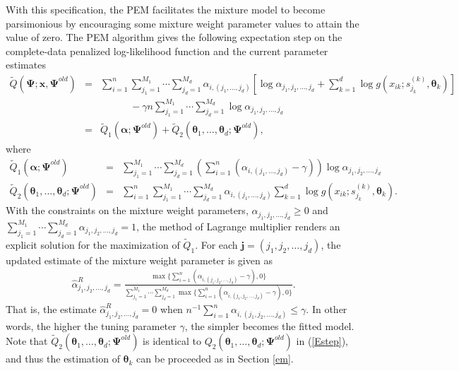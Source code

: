 \documentclass[11pt]{article}
\def\a{\alpha} \def\b{\beta}
\def\bea{\begin{eqnarray*}} \def\eea{\end{eqnarray*}}
\def\beq{\begin{eqnarray}} \def\eeq{\end{eqnarray}}
\begin{document}
With this specification, the PEM facilitates the mixture model to become parsimonious by encouraging some mixture weight parameter values to attain the value of zero. The PEM algorithm gives the following expectation step on the complete-data penalized log-likelihood function and the current parameter estimates 
\beq\label{rEstep}\nonumber
\tilde{Q}(\bm{\Psi};\bm{x}, \bm{\Psi}^{old}) &=& \sum_{i=1}^n \sum_{j_1 = 1}^{M_1} \cdots\sum_{j_d = 1}^{M_d} \a_{i,(j_1,\ldots,j_d)}\left[\log \a_{j_1,j_2,\ldots,j_d} + \sum_{k=1}^d \log g(x_{ik};s^{(k)}_{j_k}, \bm{\theta}_k)\right]\\\nonumber
&&\quad\quad\quad - \gamma n \sum_{j_1 = 1}^{M_1} \cdots\sum_{j_d = 1}^{M_d}\log \a_{j_1,j_2,\ldots,j_d}\\\nonumber
&=& \tilde{Q}_1(\bm{\a};\bm{\Psi}^{old}) + \tilde{Q}_2(\bm{\theta}_1,\ldots, \bm{\theta}_d;\bm{\Psi}^{old}), 
\eeq
where
\bea
\tilde{Q}_1(\bm{\a};\bm{\Psi}^{old})  &=& \sum_{j_1 = 1}^{M_1} \cdots\sum_{j_d = 1}^{M_d} \left(\sum_{i=1}^n (\a_{i,(j_1,\ldots,j_d)}-\gamma)\right) \log \a_{j_1,j_2,\ldots,j_d}\\
\tilde{Q}_2(\bm{\theta}_1,\ldots, \bm{\theta}_d;\bm{\Psi}^{old}) &=& \sum_{i=1}^n \sum_{j_1 = 1}^{M_1} \cdots\sum_{j_d = 1}^{M_d} \a_{i,(j_1,\ldots,j_d)}\sum_{k=1}^d \log g(x_{ik};s^{(k)}_{j_k}, \bm{\theta}_k).
\eea
With the constraints on the mixture weight parameters, $\a_{j_1,j_2,\ldots,j_d} \ge 0$ and $\sum_{j_1 = 1}^{M_1} \cdots\sum_{j_d = 1}^{M_d} \a_{j_1,j_2,\ldots,j_d} = 1$, the method of Lagrange multiplier  renders an explicit solution for the maximization of $\tilde{Q}_1$. For each $\bm{j} = (j_1,j_2,\ldots,j_d)$, the updated estimate of the mixture weight parameter is given as
\bea
\hat{\a}^{R}_{j_1,j_2,\ldots,j_d}  = \frac{\max\{\sum_{i=1}^n \left(\a_{i,(j_1,j_2,\ldots,j_d)}-\gamma\right), 0\}}{\sum_{j_1 = 1}^{M_1} \cdots\sum_{j_d = 1}^{M_d} \max\{\sum_{i=1}^n \left(\a_{i,(j_1,j_2,\ldots,j_d)}-\gamma\right), 0\}}.
\eea
That is, the estimate $\hat{\a}^{R}_{j_1,j_2,\ldots,j_d} = 0$ when $n^{-1}\sum_{i=1}^n \a_{i,(j_1,j_2,\ldots,j_d)} \le \gamma$. In other words, the higher the tuning parameter $\gamma$, the simpler becomes the fitted model. Note that $\tilde{Q}_2(\bm{\theta}_1,\ldots, \bm{\theta}_d;\bm{\Psi}^{old})$ is identical to $Q_2(\bm{\theta}_1,\ldots, \bm{\theta}_d;\bm{\Psi}^{old})$ in (\ref{Estep}), and thus the estimation of $\bm{\theta}_k$ can be proceeded as in Section \ref{em}.
\end{document}
